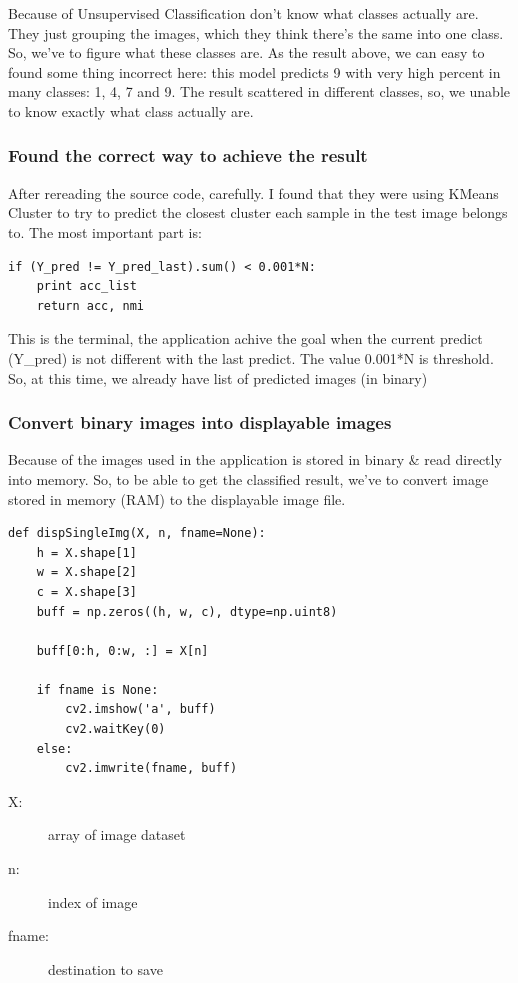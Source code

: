 \documentclass[11pt]{article}
\begin{document}
Because of Unsupervised Classification don't know what classes actually are. They just grouping the images, which they think there's the same into one class. So, we've to figure what these classes are.\newline
As the result above, we can easy to found some thing incorrect here: this model predicts 9 with very high percent in many classes: 1, 4, 7 and 9. \newline
The result scattered in different classes, so, we unable to know exactly what class actually are.

\subsubsection{Found the correct way to achieve the result}
After rereading the source code, carefully. I found that they were using KMeans Cluster to try to predict the closest cluster each sample in the test image belongs to.\newline
The most important part is:
\begin{lstlisting}
if (Y_pred != Y_pred_last).sum() < 0.001*N:
    print acc_list
    return acc, nmi
\end{lstlisting}
This is the terminal, the application achive the goal when the current predict (Y\_pred) is not different with the last predict. The value 0.001*N is threshold.\newline
So, at this time, we already have list of predicted images (in binary)

\subsubsection{Convert binary images into displayable images}
Because of the images used in the application is stored in binary \& read directly into memory. So, to be able to get the classified result, we've to convert image stored in memory (RAM) to the displayable image file. 

\begin{lstlisting}
def dispSingleImg(X, n, fname=None):
    h = X.shape[1]
    w = X.shape[2]
    c = X.shape[3]
    buff = np.zeros((h, w, c), dtype=np.uint8)

    buff[0:h, 0:w, :] = X[n]

    if fname is None:
        cv2.imshow('a', buff)
        cv2.waitKey(0)
    else:
        cv2.imwrite(fname, buff)
\end{lstlisting}
\begin{description}
\item[X:] array of image dataset
\item[n:] index of image
\item[fname:] destination to save
\end{description}
\end{document}
